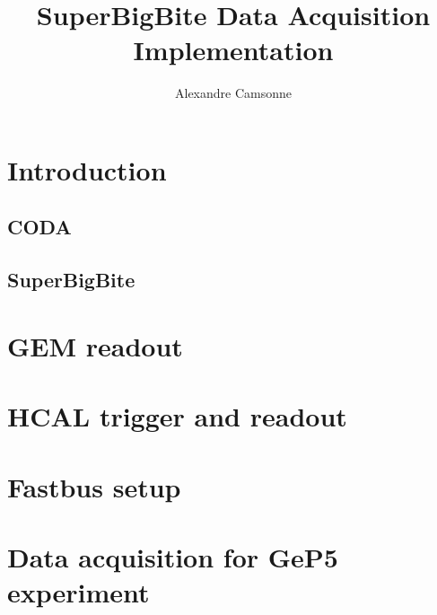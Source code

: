 \documentclass{article}
\title {SuperBigBite Data Acquisition Implementation}
\author{Alexandre Camsonne}
\begin{document}
\section{Introduction}
\subsection{CODA}
\subsection{SuperBigBite}
\section{GEM readout}

\section{HCAL trigger and readout}

\section{Fastbus setup}

\section{Data acquisition for GeP5 experiment}
\end{document}
